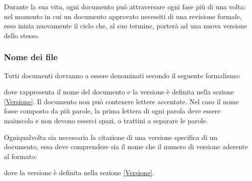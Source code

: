 \documentclass[12pt,a4paper]{article}
\begin{document}
Durante la sua vita, ogni documento può attraversare ogni fase più di una volta: nel momento in cui un documento approvato necessiti di una revisione formale, esso inizia nuovamente il ciclo che, al suo termine, porterà ad una nuova versione dello stesso.

\subsubsection{Nome dei file}
Tutti documenti dovranno a essere denominati secondo il seguente formalismo:
\begin{center}
\end{center}
dove  rappresenta il nome del documento e  la versione è definita nella sezione \ref{Versione}. Il documento non può contenere lettere accentate. Nel caso il nome fosse composto da più parole, la prima lettera di ogni parola deve essere maiuscola e non devono esserci spazi,  o trattini a separare le parole.

Ogniqualvolta sia necessaria la citazione di una versione specifica di un documento, essa deve comprendere sia il nome che il numero di versione aderente al formato:
\begin{center}
\end{center}
dove la versione è definita nella sezione \ref{Versione}.
\end{document}

